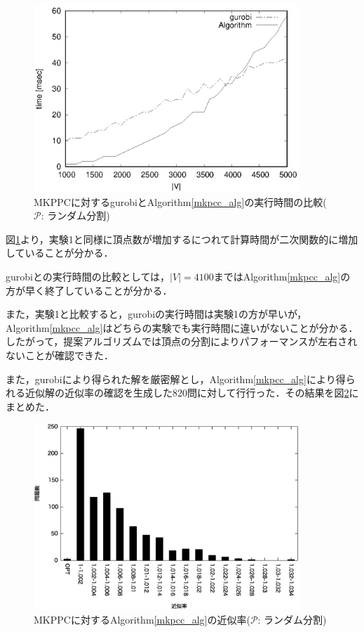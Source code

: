 \documentclass[11pt,dvipdfmx]{jarticle}
\numberwithin{equation}{section}
\begin{document}
            \begin{figure}[htbp]
                \begin{center}
                    \includegraphics[width=100mm]{jikken2.eps}
                \end{center}
                \caption{MKPPCに対するgurobiとAlgorithm\ref{mkpcc_alg}の実行時間の比較($\mathcal{P}$: ランダム分割)}
                \label{test2}
            \end{figure}
            図\ref{test2}より，実験1と同様に頂点数が増加するにつれて計算時間が二次関数的に増加していることが分かる．\par
            gurobiとの実行時間の比較としては，$|V|=4100$まではAlgorithm\ref{mkpcc_alg}の方が早く終了していることが分かる．\par
            また，実験1と比較すると，gurobiの実行時間は実験1の方が早いが，
            Algorithm\ref{mkpcc_alg}はどちらの実験でも実行時間に違いがないことが分かる．
            したがって，提案アルゴリズムでは頂点の分割によりパフォーマンスが左右されないことが確認できた．\par
            また，gurobiにより得られた解を厳密解とし，Algorithm\ref{mkpcc_alg}により得られる近似解の近似率の確認を生成した820問に対して行行った．その結果を図\ref{apx2}にまとめた．\par
            \begin{figure}[htbp]
                \begin{center}
                    \includegraphics[width=100mm]{apx2.eps}
                \end{center}
                \caption{MKPPCに対するAlgorithm\ref{mkpcc_alg}の近似率($\mathcal{P}$: ランダム分割)}
                \label{apx2}
            \end{figure}
\end{document}
